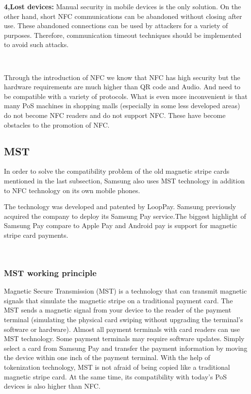 \documentclass[journal]{IEEEtran}
\begin{document}
\textbf{4,Lost devices:}
Manual security in mobile devices is the only solution. On the other hand, short NFC communications can be abandoned without closing after use. These abandoned connections can be used by attackers for a variety of purposes. Therefore, communication timeout techniques should be implemented to avoid such attacks.


\

Through the introduction of NFC we know that NFC has high security but the hardware requirements are much higher than QR code and Audio. And need to be compatible with a variety of protocols. What is even more inconvenient is that many PoS machines in shopping malls (especially in some less developed areas) do not become NFC readers and do not support NFC. These have become obstacles to the promotion of NFC.


\subsection{MST}


In order to solve the compatibility problem of the old magnetic stripe cards mentioned in the last subsection, Samsung also uses MST technology in addition to NFC technology on its own mobile phones.


The technology was developed and patented by LoopPay. Samsung previously acquired the company to deploy its Samsung Pay service.The biggest highlight of Samsung Pay compare to Apple Pay and Android pay is support for magnetic stripe card payments.

\

\subsubsection{MST working principle}
Magnetic Secure Transmission (MST) is a technology that can transmit magnetic signals that simulate the magnetic stripe on a traditional payment card. The MST sends a magnetic signal from your device to the reader of the payment terminal (simulating the physical card swiping without upgrading the terminal's software or hardware). Almost all payment terminals with card readers can use MST technology. Some payment terminals may require software updates. Simply select a card from Samsung Pay and transfer the payment information by moving the device within one inch of the payment terminal. With the help of tokenization technology, MST is not afraid of being copied like a traditional magnetic stripe card. At the same time, its compatibility with today's PoS devices is also higher than NFC.
\end{document}
